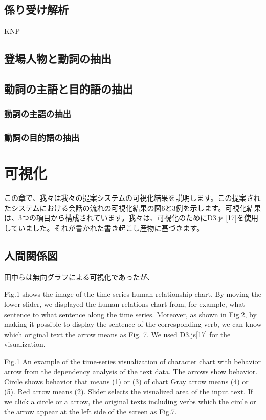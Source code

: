 \documentclass[shuuron]{kuee}
\begin{document}
  \subsection{係り受け解析}

  KNP

  \subsection{登場人物と動詞の抽出}



  \subsection{動詞の主語と目的語の抽出}

\subsubsection{動詞の主語の抽出}
\subsubsection{動詞の目的語の抽出}


\section{可視化}

この章で、我々は我々の提案システムの可視化結果を説明します。この提案されたシステムにおける会話の流れの可視化結果の図6と3例を示します。可視化結果は、3つの項目から構成されています。我々は、可視化のためにD3.js [17]を使用していました。それが書かれた書き起こし産物に基づきます。



\subsection{人間関係図}

田中らは無向グラフによる可視化であったが、

  Fig.1 shows the image of the time series human relationship chart. By moving the lower slider, we displayed the human relations chart from, for example, what sentence to what sentence along the time series. Moreover, as shown in Fig.2, by making it possible to display the sentence of the corresponding verb, we can know which original text the arrow means as Fig. 7. We used D3.js[17] for the visualization.


Fig.1 An example of the time-series visualization of character chart with behavior arrow from the dependency analysis of the text data. The arrows show behavior. Circle shows behavior that means (1) or (3) of chart Gray arrow means (4) or (5). Red arrow means (2). Slider selects the visualized area of the input text. If we click a circle or a arrow, the original texts including verbs which the circle or the arrow appear at the left side of the screen as Fig.7.
\end{document}
